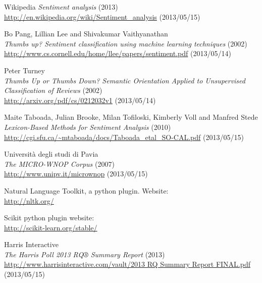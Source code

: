 \documentclass[a4paper,12pt]{report}
\begin{document}
\begin{thebibliography}{9}


  Wikipedia
  \emph{Sentiment analysis} (2013)
  \url{http://en.wikipedia.org/wiki/Sentiment_analysis} (2013/05/15)

  Bo Pang, Lillian Lee and Shivakumar Vaithyanathan\\
  \emph{Thumbs up? Sentiment classification using machine learning techniques} (2002)\\
  \url{http://www.cs.cornell.edu/home/llee/papers/sentiment.pdf} (2013/05/14)

  Peter Turney\\
  \emph{Thumbs Up or Thumbs Down? Semantic Orientation Applied to Unsupervised Classification of Reviews} (2002)\\
  \url{http://arxiv.org/pdf/cs/0212032v1} (2013/05/14)

  Maite Taboada, Julian Brooke, Milan Tofiloski, Kimberly Voll and Manfred Stede\\
  \emph{Lexicon-Based Methods for Sentiment Analysis} (2010)\\
  \url{http://cgi.sfu.ca/~mtaboada/docs/Taboada_etal_SO-CAL.pdf} (2013/05/15)

  Università degli studi di Pavia\\
  \emph{The MICRO-WNOP Corpus} (2007)\\
  \url{http://www.unipv.it/micrownop} (2013/05/15)
  
  Natural Language Toolkit, a python plugin. Website:\\
  \url{http://nltk.org/}
  
  Scikit python plugin website:\\
  \url{http://scikit-learn.org/stable/}

  Harris Interactive\\
  \emph{The Harris Poll 2013 RQ® Summary Report} (2013)\\
  \url{http://www.harrisinteractive.com/vault/2013 RQ Summary Report FINAL.pdf} (2013/05/15)

\end{thebibliography}
\end{document}
